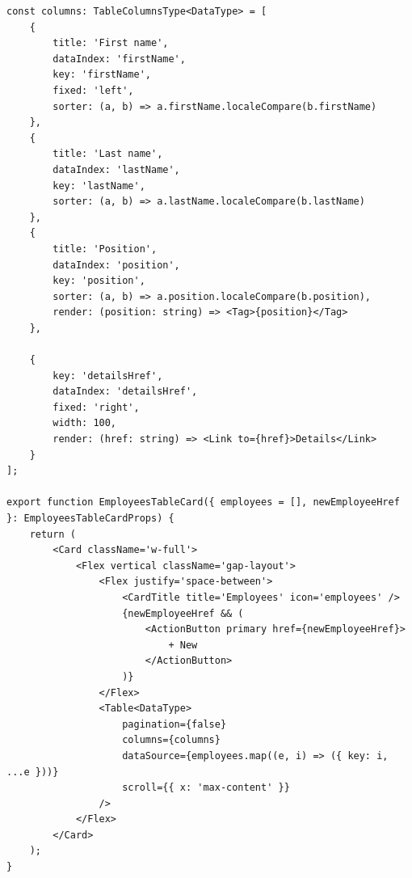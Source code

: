 \documentclass[../../spr.tex]{subfiles}
\begin{document}
\begin{lstlisting}[caption=Przykład generowania tabeli. Tworzenie tabeli w każdym przypadku odbywa się za pośrednictwem komponentu \textit{Table} z \textit{Ant Design}.]
const columns: TableColumnsType<DataType> = [
    {
        title: 'First name',
        dataIndex: 'firstName',
        key: 'firstName',
        fixed: 'left',
        sorter: (a, b) => a.firstName.localeCompare(b.firstName)
    },
    {
        title: 'Last name',
        dataIndex: 'lastName',
        key: 'lastName',
        sorter: (a, b) => a.lastName.localeCompare(b.lastName)
    },
    {
        title: 'Position',
        dataIndex: 'position',
        key: 'position',
        sorter: (a, b) => a.position.localeCompare(b.position),
        render: (position: string) => <Tag>{position}</Tag>
    },

    {
        key: 'detailsHref',
        dataIndex: 'detailsHref',
        fixed: 'right',
        width: 100,
        render: (href: string) => <Link to={href}>Details</Link>
    }
];

export function EmployeesTableCard({ employees = [], newEmployeeHref }: EmployeesTableCardProps) {
    return (
        <Card className='w-full'>
            <Flex vertical className='gap-layout'>
                <Flex justify='space-between'>
                    <CardTitle title='Employees' icon='employees' />
                    {newEmployeeHref && (
                        <ActionButton primary href={newEmployeeHref}>
                            + New
                        </ActionButton>
                    )}
                </Flex>
                <Table<DataType>
                    pagination={false}
                    columns={columns}
                    dataSource={employees.map((e, i) => ({ key: i, ...e }))}
                    scroll={{ x: 'max-content' }}
                />
            </Flex>
        </Card>
    );
}
\end{lstlisting}
\end{document}

